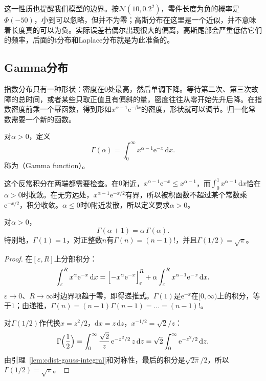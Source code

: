这一性质也提醒我们模型的边界。按$\mathcal{N}(10,0.2^{2})$，零件长度为负的概率是$\Phi(-50)$，小到可以忽略，但并不为零；高斯分布在这里是一个近似，并不意味着长度真的可以为负。实际误差若偶尔出现很大的偏离，高斯尾部会严重低估它们的频率，后面的t分布和Laplace分布就是为此准备的。

\subsection{Gamma分布}
\label{sec:cdist-gamma}

指数分布只有一种形状：密度在$0$处最高，然后单调下降。等待第二次、第三次故障的总时间，或者某些只取正值且有偏斜的量，密度往往从零开始先升后降。在指数密度前乘一个幂函数，得到形如$x^{\alpha-1}\mathrm{e}^{-\beta x}$的密度，形状就可以调节。归一化常数需要一个新的函数。

\begin{definition}[Gamma函数]
\label{def:cdist-gamma-function}
对$\alpha>0$，定义
\begin{equation}
  \Gamma(\alpha)=\int_0^{\infty}x^{\alpha-1}\mathrm{e}^{-x}\,\mathrm{d}x .
  \label{eq:cdist-gamma-function}
\end{equation}
称为（Gamma function）。
\end{definition}

这个反常积分在两端都需要检查。在$0$附近，$x^{\alpha-1}\mathrm{e}^{-x}\leq x^{\alpha-1}$，而$\int_0^1x^{\alpha-1}\,\mathrm{d}x$恰在$\alpha>0$时收敛。在无穷远处，$x^{\alpha-1}\mathrm{e}^{-x/2}$有界，所以被积函数不超过某个常数乘$\mathrm{e}^{-x/2}$，积分收敛。$\alpha\leq0$时$0$附近发散，所以定义要求$\alpha>0$。

\begin{lemma}[Gamma函数的递推]
\label{lem:cdist-gamma-recursion}
对$\alpha>0$，
\begin{equation}
  \Gamma(\alpha+1)=\alpha\,\Gamma(\alpha).
  \label{eq:cdist-gamma-recursion}
\end{equation}
特别地，$\Gamma(1)=1$，对正整数$n$有$\Gamma(n)=(n-1)!$，并且$\Gamma(1/2)=\sqrt\pi$。
\end{lemma}

\begin{proof}
在$[\varepsilon,R]$上分部积分：
\[
  \int_{\varepsilon}^{R}x^{\alpha}\mathrm{e}^{-x}\,\mathrm{d}x
  =\Bigl[-x^{\alpha}\mathrm{e}^{-x}\Bigr]_{\varepsilon}^{R}+\alpha\int_{\varepsilon}^{R}x^{\alpha-1}\mathrm{e}^{-x}\,\mathrm{d}x .
\]
$\varepsilon\to0$、$R\to\infty$时边界项趋于零，即得递推式。$\Gamma(1)$是$\mathrm{e}^{-x}$在$[0,\infty)$上的积分，等于$1$；由递推，$\Gamma(n)=(n-1)\Gamma(n-1)=\dots=(n-1)!$。

对$\Gamma(1/2)$作代换$x=z^{2}/2$，$\mathrm{d}x=z\,\mathrm{d}z$，$x^{-1/2}=\sqrt2/z$：
\[
  \Gamma\Bigl(\frac12\Bigr)=\int_0^{\infty}\frac{\sqrt2}{z}\,\mathrm{e}^{-z^{2}/2}\,z\,\mathrm{d}z=\sqrt2\int_0^{\infty}\mathrm{e}^{-z^{2}/2}\,\mathrm{d}z .
\]
由引理~\ref{lem:cdist-gauss-integral}和对称性，最后的积分是$\sqrt{2\pi}/2$，所以$\Gamma(1/2)=\sqrt\pi$。
\end{proof}

